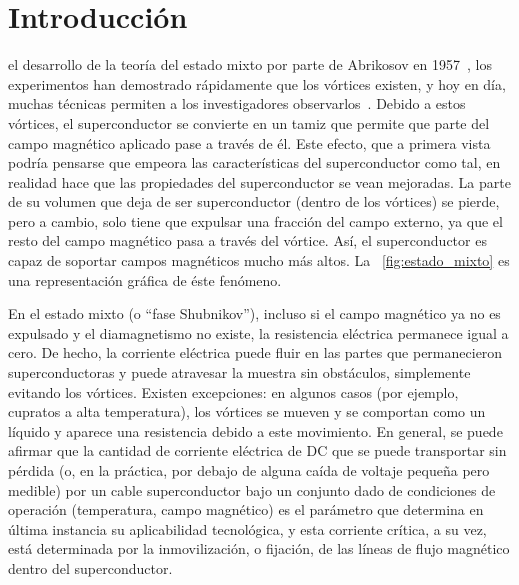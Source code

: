 \documentclass[a4paper,conference]{IEEEtran}
\begin{document}
\section{Introducci\'{o}n}
% 
% 
% 
% 
 el desarrollo de la teor\'{i}a del estado mixto 
 por parte de
Abrikosov en 1957~\cite{Abrikosov1957}, los experimentos han demostrado
r\'{a}pidamente que los v\'{o}rtices existen, y hoy en d\'{i}a, muchas
t\'{e}cnicas permiten a los investigadores observarlos~\cite{Goa2003, Olsen2004,
Vestgarden2007}.  Debido a estos v\'{o}rtices, el superconductor se convierte en
un tamiz que permite que parte del campo magn\'{e}tico aplicado pase a
trav\'{e}s de \'{e}l. 
Este efecto, que a primera vista podr\'{i}a pensarse que empeora las
caracter\'{i}sticas del superconductor como tal, en realidad hace que las
propiedades del superconductor se vean mejoradas. La parte de su volumen que
deja de ser superconductor (dentro de los v\'{o}rtices) se pierde, pero a
cambio, solo tiene que expulsar una fracci\'{o}n del campo externo, ya que el
resto del campo magn\'{e}tico pasa a trav\'{e}s del v\'{o}rtice. As\'{i}, el
superconductor es capaz de soportar campos magn\'{e}ticos mucho m\'{a}s altos.
La \figurename~\ref{fig:estado_mixto} es una representaci\'{o}n gr\'{a}fica de
\'{e}ste fen\'{o}meno.

En el estado mixto (o ``fase Shubnikov''), incluso si el campo magn\'{e}tico ya
no es expulsado y el diamagnetismo no existe, la resistencia el\'{e}ctrica
permanece igual a cero. De hecho, la corriente el\'{e}ctrica puede fluir en las
partes que permanecieron superconductoras y puede atravesar la muestra sin
obst\'{a}culos, simplemente evitando los v\'{o}rtices. Existen excepciones: en
algunos casos (por ejemplo, cupratos a alta temperatura), los v\'{o}rtices se
mueven y se comportan como un l\'{i}quido y aparece una resistencia debido a
este movimiento.  En general, se puede afirmar que la cantidad de corriente
el\'{e}ctrica de DC que se puede transportar sin p\'{e}rdida (o, en la
pr\'{a}ctica, por debajo de alguna ca\'{i}da de voltaje peque\~{n}a pero
medible)
por un cable superconductor bajo un conjunto dado de condiciones de
operaci\'{o}n (temperatura, campo magn\'{e}tico) es el par\'{a}metro que
determina en \'{u}ltima instancia su aplicabilidad tecnol\'{o}gica, y esta
corriente cr\'{i}tica, a su vez, est\'{a} determinada por la inmovilizaci\'{o}n,
o fijaci\'{o}n, de las l\'{i}neas de flujo magn\'{e}tico dentro del
superconductor.
\end{document}
